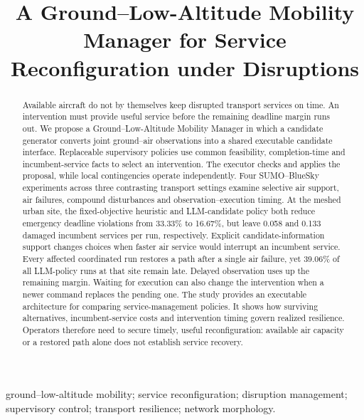 \documentclass[]{interact}
\theoremstyle{plain}
\theoremstyle{definition}
\theoremstyle{remark}
\begin{document}

\title{A Ground--Low-Altitude Mobility Manager for Service Reconfiguration under Disruptions}

\author{
}

\maketitle

\begin{abstract}
Available aircraft do not by themselves keep disrupted transport services on time. An intervention must provide useful service before the remaining deadline margin runs out. We propose a Ground--Low-Altitude Mobility Manager in which a candidate generator converts joint ground--air observations into a shared executable candidate interface. Replaceable supervisory policies use common feasibility, completion-time and incumbent-service facts to select an intervention. The executor checks and applies the proposal, while local contingencies operate independently. Four SUMO--BlueSky experiments across three contrasting transport settings examine selective air support, air failures, compound disturbances and observation--execution timing. At the meshed urban site, the fixed-objective heuristic and LLM-candidate policy both reduce emergency deadline violations from 33.33\% to 16.67\%, but leave 0.058 and 0.133 damaged incumbent services per run, respectively. Explicit candidate-information support changes choices when faster air service would interrupt an incumbent service. Every affected coordinated run restores a path after a single air failure, yet 39.06\% of all LLM-policy runs at that site remain late. Delayed observation uses up the remaining margin. Waiting for execution can also change the intervention when a newer command replaces the pending one. The study provides an executable architecture for comparing service-management policies. It shows how surviving alternatives, incumbent-service costs and intervention timing govern realized resilience. Operators therefore need to secure timely, useful reconfiguration: available air capacity or a restored path alone does not establish service recovery.
\end{abstract}

\begin{keywords}
ground--low-altitude mobility; service reconfiguration; disruption management; supervisory control; transport resilience; network morphology.
\end{keywords}
\end{document}
